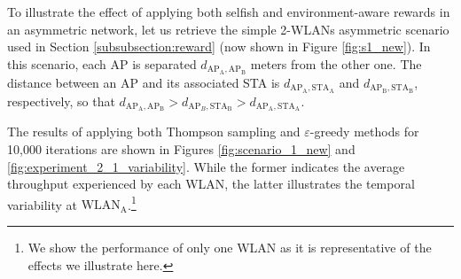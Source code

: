 \documentclass{article}
\begin{document}
To illustrate the effect of applying both selfish and environment-aware rewards in an asymmetric network, let us retrieve the simple 2-WLANs asymmetric scenario used in Section \ref{subsubsection:reward} (now shown in Figure \ref{fig:s1_new}). In this scenario, each AP is separated $d_{\text{AP}_\text{A},\text{AP}_\text{B}}$ meters from the other one. The distance between an AP and its associated STA is $d_{\text{AP}_\text{A},\text{STA}_\text{A}}$ and $d_{\text{AP}_\text{B},\text{STA}_\text{B}}$, respectively, so that $d_{\text{AP}_\text{A},\text{AP}_\text{B}} > d_{\text{AP}_B,\text{STA}_\text{B}} > d_{\text{AP}_\text{A},\text{STA}_\text{A}}$. 

The results of applying both Thompson sampling and $\varepsilon$-greedy methods for 10,000 iterations are shown in Figures \ref{fig:scenario_1_new} and \ref{fig:experiment_2_1_variability}. While the former indicates the average throughput experienced by each WLAN, the latter illustrates the temporal variability at $\text{WLAN}_\text{A}$.\footnote{We show the performance of only one WLAN as it is representative of the effects we illustrate here.}
\end{document}
